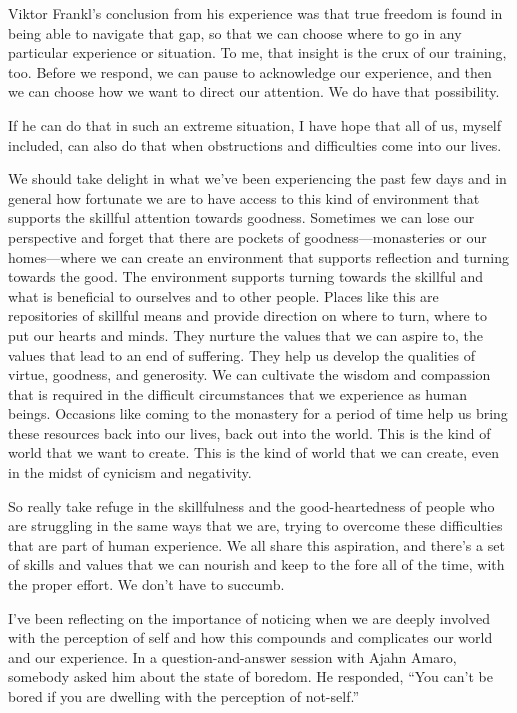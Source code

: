 Viktor Frankl's conclusion from his experience was that true freedom is found in being able to navigate that gap, so that we can choose where to go in any particular experience or situation. To me, that insight is the crux of our training, too. Before we respond, we can pause to acknowledge our experience, and then we can choose how we want to direct our attention. We do have that possibility.

If he can do that in such an extreme situation, I have hope that all of us, myself included, can also do that when obstructions and difficulties come into our lives.

\enlargethispage{-1\baselineskip}
We should take delight in what we've been experiencing the past few days and in general how fortunate we are to have access to this kind of environment that supports the skillful attention towards goodness. Sometimes we can lose our perspective and forget that there are pockets of goodness---monasteries or our homes---where we can create an environment that supports reflection and turning towards the good. The environment supports turning towards the skillful and what is beneficial to ourselves and to other people. Places like this are repositories of skillful means and provide direction on where to turn, where to put our hearts and minds. They nurture the values that we can aspire to, the values that lead to an end of suffering. They help us develop the qualities of virtue, goodness, and generosity. We can cultivate the wisdom and compassion that is required in the difficult circumstances that we experience as human beings. Occasions like coming to the monastery for a period of time help us bring these resources back into our lives, back out into the world. This is the kind of world that we want to create. This is the kind of world that we can create, even in the midst of cynicism and negativity.

So really take refuge in the skillfulness and the good-heartedness of people who are struggling in the same ways that we are, trying to overcome these difficulties that are part of human experience. We all share this aspiration, and there's a set of skills and values that we can nourish and keep to the fore all of the time, with the proper effort. We don't have to succumb.

I've been reflecting on the importance of noticing when we are deeply involved with the perception of self and how this compounds and complicates our world and our experience. In a question-and-answer session with Ajahn Amaro, somebody asked him about the state of boredom. He responded, ``You can't be bored if you are dwelling with the perception of not-self.''


